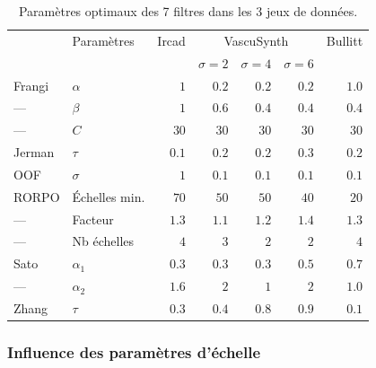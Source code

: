 \begin{table}[!ht]
 
  \begin{center}
  \caption{Paramètres optimaux des 7 filtres dans les 3 jeux de données.}
      \begin{tabular}{llrrrrr}
                          \hline
             & Paramètres  & Ircad       &  \multicolumn{3}{c}{VascuSynth}            &  Bullitt\\
             &   &         & $\sigma = 2$  & $\sigma = 4$ & $\sigma = 6$ &       \\
                         \hline
      Frangi &  $\alpha$  & $1$         & $0.2$     & $0.2$        & $0.2$           & $1.0$   \\
      ---    &  $\beta$   & $1$         & $0.6$     & $0.4$       & $0.4$           & $0.4$   \\
      ---    &  $C$       & $30$        & $30$       & $30$         & $30$            & $30$    \\
      Jerman & $\tau$     & $0.1$       & $0.2$     & $0.2$       & $0.3$          & $0.2$  \\
      OOF &  $\sigma$     & $1$         & $0.1$      & $0.1$        & $0.1$           & $0.1$   \\
      RORPO  & Échelles min.  & $70$        & $50$       & $50$         & $40$            & $20$    \\
      ---    & Facteur      & $1.3$       & $1.1$     & $1.2$       & $1.4$          & $1.3$  \\
      ---    &  Nb échelles  & $4$         & $3$        & $2$          & $2$             & $4$     \\
      Sato   & $\alpha_1$ & $0.3$       & $0.3$      & $0.3$        & $0.5$          & $0.7$   \\
      ---   & $\alpha_2$ & $1.6$       & $2$      & $1$        & $2$           & $1.0$   \\
      Zhang  & $\tau$     & $0.3$       & $0.4$     & $0.8$       & $0.9$          & $0.1$  \\
          \hline
      \end{tabular}
  \label{tab:optimal_parameters}
  \end{center}
\end{table}


\subsubsection{Influence des paramètres d'échelle}

